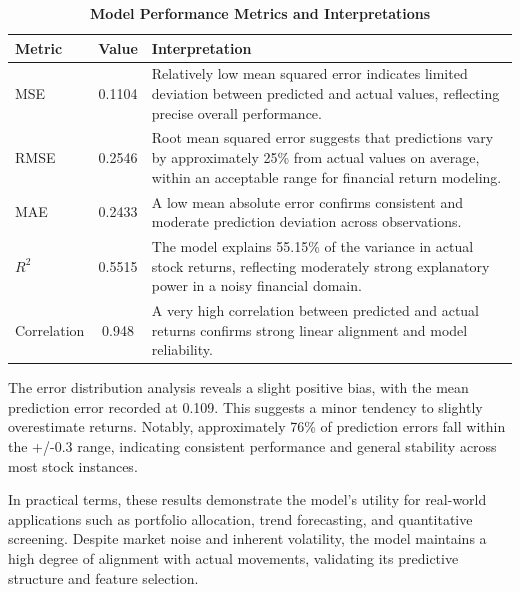 \documentclass[3p,times,procedia]{elsarticle}
\begin{document}

\begin{table}[!ht]
\centering
\caption{\textbf{Model Performance Metrics and Interpretations}}
\begin{tabular}{|l|c|l|}
\hline
\textbf{Metric} & \textbf{Value} & \textbf{Interpretation} \\
\hline
MSE         & 0.1104 & \begin{minipage}[t]{8cm}Relatively low mean squared error indicates limited deviation between predicted and actual values, reflecting precise overall performance.\end{minipage} \\[2ex]
RMSE        & 0.2546 & \begin{minipage}[t]{8cm}Root mean squared error suggests that predictions vary by approximately 25\% from actual values on average, within an acceptable range for financial return modeling.\end{minipage} \\[2ex]
MAE         & 0.2433 & \begin{minipage}[t]{8cm}A low mean absolute error confirms consistent and moderate prediction deviation across observations.\end{minipage} \\[2ex]
$R^2$       & 0.5515 & \begin{minipage}[t]{8cm}The model explains 55.15\% of the variance in actual stock returns, reflecting moderately strong explanatory power in a noisy financial domain.\end{minipage} \\[2ex]
Correlation & 0.948  & \begin{minipage}[t]{8cm}A very high correlation between predicted and actual returns confirms strong linear alignment and model reliability.\end{minipage} \\[2ex]
\hline
\end{tabular}
\end{table}

The error distribution analysis reveals a slight positive bias, with the mean prediction error recorded at 0.109. This suggests a minor tendency to slightly overestimate returns. Notably, approximately 76\% of prediction errors fall within the +/-0.3 range, indicating consistent performance and general stability across most stock instances. 

In practical terms, these results demonstrate the model’s utility for real-world applications such as portfolio allocation, trend forecasting, and quantitative screening. Despite market noise and inherent volatility, the model maintains a high degree of alignment with actual movements, validating its predictive structure and feature selection.
\end{document}
